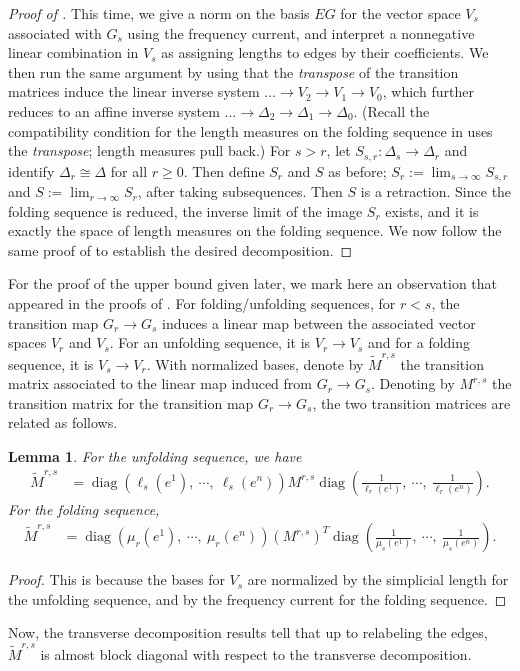 \documentclass[11pt, letterpaper]{amsart}
\theoremstyle{plain}
\newtheorem{lemma}[theorem]{Lemma}
\theoremstyle{definition}
\DeclareMathOperator{\diag}{diag}
\newcommand{\wt}[1]{\widetilde{#1}}
\begin{document}
\begin{proof}[Proof of ]
This time, we give a norm on the basis $EG$ for the vector space $V_s$
associated with $G_s$ using the frequency current, and interpret a nonnegative
linear combination in $V_s$ as assigning lengths to edges by their coefficients.
We then run the same argument by using that the \emph{transpose} of the transition
matrices induce the linear inverse system $\ldots \to V_2 \to V_1 \to V_0$, which
further reduces to an affine inverse system $\ldots \to \Delta_2 \to \Delta_1
\to \Delta_0$.
(Recall the compatibility condition for the length measures on the folding
sequence in  uses the \emph{transpose}; length measures
pull back.)
For $s > r$, let
$S_{s,r}:\Delta_s \to \Delta_r$ and identify $\Delta_r \cong \Delta$ for all $r
\ge 0$. Then define $S_{r}$ and $S$ as before; $S_r:=\lim_{s \to \infty}S_{s,r}$
and $S:=\lim_{r \to \infty}S_r$, after taking subsequences. Then $S$ is a
retraction. Since the folding sequence is reduced, the inverse
limit of the image $S_r$ exists, and it is exactly the space of length measures
on the folding sequence. We now follow the same proof of
 to establish the desired decomposition.
\end{proof}

For the proof of the upper bound given later, we mark here an observation that appeared in
the proofs of .
For folding/unfolding sequences, for $r<s$, the transition map $G_r \to G_s$
induces a linear map between the associated vector spaces $V_r$ and $V_s$. For an
unfolding sequence, it is $V_r \to V_s$ and for a folding sequence, it is $V_s \to
V_r$. With normalized bases, denote by $\wt{M}^{r,s}$ the transition matrix
associated to the linear map induced from $G_r \to G_s$.
Denoting by $M^{r,s}$
the transition matrix for the transition map $G_r \to G_s$, the two
transition matrices are related as follows.
\begin{lemma}\label{lem:transition_relation}
  For the unfolding sequence, we have
  \begin{align*}
    \wt{M}^{r,s} &= \diag\left(\ell_s(e^1),\ \cdots, \ \ell_s(e^n)\right) M^{r,s} \diag\left(\frac{1}{\ell_r(e^1)},\ \cdots, \ \frac{1}{\ell_r(e^n)}\right).
  \end{align*}
  For the folding sequence,
  \begin{align*}
    \wt{M}^{r,s} &= \diag\left(\mu_r(e^1),\ \cdots, \ \mu_r(e^n)\right) (M^{r,s})^T \diag\left(\frac{1}{\mu_s(e^1)},\ \cdots, \ \frac{1}{\mu_s(e^n)}\right).
  \end{align*}
\end{lemma}
\begin{proof}
  This is because the bases for $V_s$ are normalized by the
  simplicial length for the unfolding sequence, and by the frequency current for
  the folding sequence.
\end{proof}
Now, the transverse decomposition results tell that up to relabeling the edges,
$\wt{M}^{r,s}$ is almost block diagonal with respect to the transverse decomposition.
\end{document}
